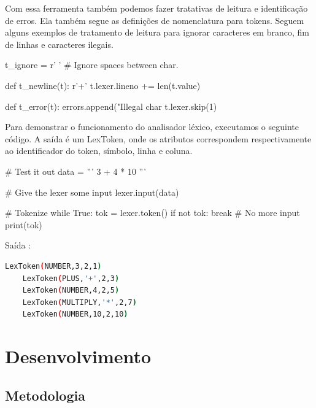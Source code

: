 \documentclass[
	12pt,				%
	openright,			%
	twoside,			%
	a4paper,			%
	english,			%
	french,				%
	spanish,			%
	brazil				%
	]{abntex2}
\begin{document}
Com essa ferramenta também podemos fazer tratativas de leitura e identificação de erros.
Ela também segue as definições de nomenclatura para tokens. Seguem alguns exemplos
de tratamento de leitura para ignorar caracteres em branco, fim de linhas e caracteres ilegais.
\begin{python}
t_ignore = r' ' # Ignore spaces between char.

def t_newline(t):
	r'\n+'
	t.lexer.lineno += len(t.value)

def t_error(t):
    errors.append("Illegal char %
    t.lexer.skip(1)

\end{python}

Para demonstrar o funcionamento do analisador léxico, executamos o seguinte
código. A saída é um LexToken, onde os atributos correspondem respectivamente ao 
identificador do token, símbolo, linha e coluna.

\begin{python}
# Test it out
data = '''
3 + 4 * 10
'''

# Give the lexer some input
lexer.input(data)

# Tokenize
while True:
    tok = lexer.token()
    if not tok:
        break      # No more input
    print(tok)
\end{python}
\noindent Saída :
\begin{lstlisting}[language=bash]
    LexToken(NUMBER,3,2,1)
    LexToken(PLUS,'+',2,3)
    LexToken(NUMBER,4,2,5)
    LexToken(MULTIPLY,'*',2,7)
    LexToken(NUMBER,10,2,10)

\end{lstlisting}


\part{Desenvolvimento}

\chapter{Metodologia}
\end{document}
